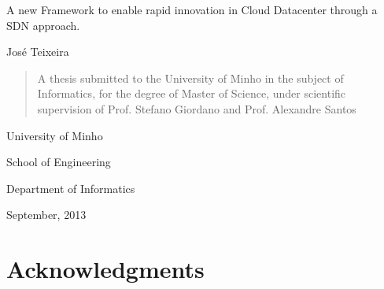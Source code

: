 \documentclass[12pt,english,oneside]{book}
\begin{document}
\begin{minipage}[c]{1.0\columnwidth}%
\begin{doublespace}
\vspace{2cm}
\begin{center}{\huge A new Framework to enable rapid innovation in Cloud Datacenter through a SDN approach.}\end{center}{\huge \par}
\end{doublespace}

\vspace{2cm}
\begin{center}{\large Jos\'{e} Teixeira}\end{center}{\large \par}
\vspace{2cm}

\begin{quote}
\begin{center}A thesis submitted to the University of Minho in the
subject of Informatics, for the degree of
Master of Science, under scientific supervision of Prof. Stefano Giordano and Prof. Alexandre Santos\end{center}\vspace{3cm}

\end{quote}
\begin{singlespace}
\begin{center}University of Minho\end{center}

\begin{center}School of Engineering\end{center}

\begin{center}Department of Informatics\end{center}
\end{singlespace}

\begin{center}{\large September, 2013}\end{center}\end{minipage}%
\thispagestyle{empty}



\newpage


\chapter*{Acknowledgments}
\end{document}

